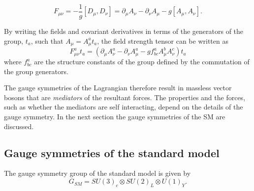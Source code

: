 \begin{equation}
F_{\mu\nu} = - \frac{1}{g}\left[D_{\mu},D_{\nu}\right] = \partial_{\mu}A_{\nu} - \partial_{\nu} A_{\mu} - g\left[A_{\mu},A_{\nu}\right].
\end{equation}

By writing the fields and covariant derivatives in terms of the generators of the group, $t_{a}$, such
that $A_{\mu} = A^{a}_{\mu} t_{a}$, the field strength tensor can be written as 
\begin{equation}
F^{a}_{\mu\nu}t_{a} = \left(\partial_{\mu}A^{a}_{\nu} - \partial_{\nu} A^{a}_{\mu} - g f_{bc}^{a}A^b_{\mu}A^c_{\nu}\right)t_a
\end{equation}
where $f_{bc}^{a}$ are the structure constants of the group defined by the 
commutation of the group generators. 

The gauge symmetries of the Lagrangian therefore result in massless vector 
bosons that are \emph{mediators} of the resultant forces. The properties and 
the forces, such as whether the mediators are self interacting, depend on the 
details of the gauge symmetry. In the next section the gauge symmetries
of the SM are discussed. 

%


\subsection{Gauge symmetries of the standard model}
\label{sec:sm-gs}
The gauge symmetry group of the standard model is given by~\cite{ewk-int}
\begin{equation}
G_{SM} = SU(3)_{c}\otimes SU(2)_{L}\otimes U(1)_{Y}.
\end{equation}

